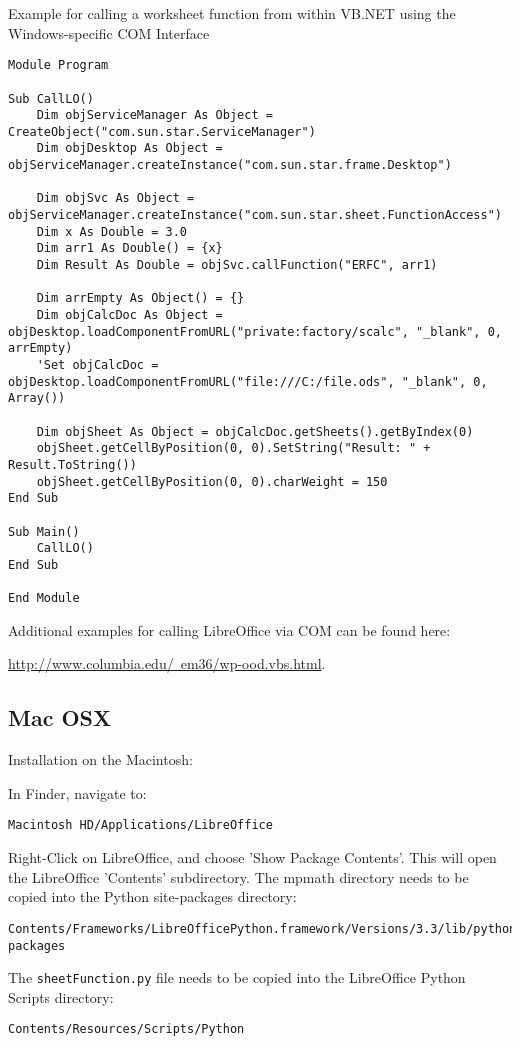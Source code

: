 Example for calling a worksheet function from within VB.NET using the Windows-specific COM Interface

\begin{lstlisting}
Module Program

Sub CallLO()
	Dim objServiceManager As Object = CreateObject("com.sun.star.ServiceManager")
	Dim objDesktop As Object = objServiceManager.createInstance("com.sun.star.frame.Desktop")
	
	Dim objSvc As Object = objServiceManager.createInstance("com.sun.star.sheet.FunctionAccess")
	Dim x As Double = 3.0
	Dim arr1 As Double() = {x}
	Dim Result As Double = objSvc.callFunction("ERFC", arr1)
	
	Dim arrEmpty As Object() = {}
	Dim objCalcDoc As Object = objDesktop.loadComponentFromURL("private:factory/scalc", "_blank", 0, arrEmpty)
	'Set objCalcDoc = objDesktop.loadComponentFromURL("file:///C:/file.ods", "_blank", 0, Array())
	
	Dim objSheet As Object = objCalcDoc.getSheets().getByIndex(0)
	objSheet.getCellByPosition(0, 0).SetString("Result: " + Result.ToString())
	objSheet.getCellByPosition(0, 0).charWeight = 150        
End Sub

Sub Main()
	CallLO()
End Sub

End Module
\end{lstlisting}

Additional examples for calling LibreOffice via COM can be found here:

\href{http://www.columbia.edu/~em36/wp-ood.vbs.html}{http://www.columbia.edu/~em36/wp-ood.vbs.html}. 



\subsection{Mac OSX}
Installation on the Macintosh:

In Finder, navigate to:
\begin{verbatim}
Macintosh HD/Applications/LibreOffice
\end{verbatim}	
Right-Click on LibreOffice, and choose 'Show Package Contents'. This will open the LibreOffice  'Contents' subdirectory.
The mpmath directory needs to be copied into the Python site-packages directory:
\begin{verbatim}
Contents/Frameworks/LibreOfficePython.framework/Versions/3.3/lib/python3.3/site-packages
\end{verbatim}
The \verb|sheetFunction.py| file needs to be copied into the  LibreOffice Python Scripts directory:
\begin{verbatim}
Contents/Resources/Scripts/Python
\end{verbatim}


